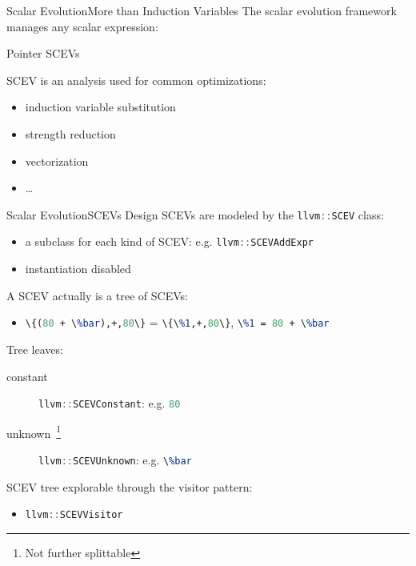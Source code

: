 \documentclass[10pt,mathserif]{beamer}
\newcommand{\cppinline}[1]{\lstinline[language=C++]!#1!}
\newcommand{\llvminput}[1]{}
\newcommand{\llvminline}[1]{\lstinline[language=LLVM]!#1!}
\begin{document}
\begin{frame}{Scalar Evolution}{More than Induction Variables}
The scalar evolution framework manages \alert{any scalar expression}:

\begin{block}{Pointer SCEVs}
\centering
\llvminput{snippet/02/nested-scev-pointer.ll}
\end{block}

\vfill
SCEV is an analysis used for common optimizations:
\begin{itemize}
\item induction variable substitution
\item strength reduction
\item vectorization
\item \ldots
\end{itemize}
\end{frame}

\begin{frame}{Scalar Evolution}{SCEVs Design}
SCEVs are modeled by the \cppinline{llvm::SCEV} class:

\begin{itemize}
\item a subclass for each kind of SCEV: e.g. \cppinline{llvm::SCEVAddExpr}
\item instantiation disabled
\end{itemize}

\vfill
A SCEV actually is a tree of SCEVs:

\begin{itemize}
\item \llvminline{\{(80 + \%bar),+,80\}} = \llvminline{\{\%1,+,80\}},
      \llvminline{\%1 = 80 + \%bar}
\end{itemize}

Tree leaves:

\begin{description}
\item[constant] \cppinline{llvm::SCEVConstant}: e.g. \llvminline{80}
\item[unknown~\footnote{Not further splittable}] \cppinline{llvm::SCEVUnknown}:
                                                 e.g. \llvminline{\%bar}
\end{description}

SCEV tree explorable through the visitor pattern:

\begin{itemize}
\item \cppinline{llvm::SCEVVisitor}
\end{itemize}
\end{frame}
\end{document}
